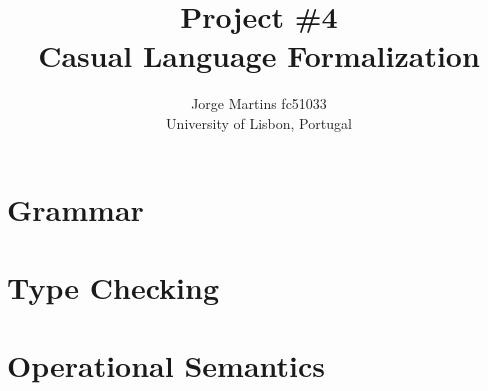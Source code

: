 \documentclass[11pt, a4paper]{article}
\author{Jorge Martins fc51033\\
University of Lisbon, Portugal}
\date{}
\title{Project \#4\\ Casual Language Formalization}
\begin{document}
\maketitle
\thispagestyle{empty}
\newpage
\section{Grammar}
\section{Type Checking}
\section{Operational Semantics}
\end{document}

